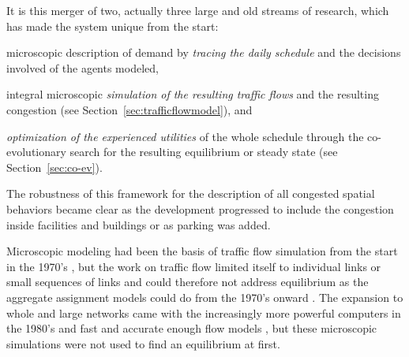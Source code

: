 It is this merger of two, actually three large and old streams of research, which has made the system unique from the start: 
\begin{compactitem}
\item microscopic description of demand by \emph{tracing the daily schedule} and the decisions involved of the agents modeled, 
%
\item integral microscopic \emph{simulation of the resulting traffic flows} and the resulting congestion (see Section~\ref{sec:trafficflowmodel}), and
%
\item  \emph{optimization of the experienced utilities} of the whole schedule through the co-evolutionary search for the resulting equilibrium or steady state (see Section~\ref{sec:co-ev}). 
%
\end{compactitem}
The robustness of this framework for the description of all congested spatial behaviors became clear as the development progressed to include the congestion inside facilities and buildings or as parking was added. 









Microscopic modeling had been the basis of traffic flow simulation from the start in the 1970’s \citep[e.g.,][]{Wiedemann_PhDThesis_1974, Seddon_Simulation_1972}, but the work on traffic flow limited itself to individual links or small sequences of links and could therefore not address equilibrium as the aggregate assignment models could do from the 1970’s onward \citep[see][]{OrtuzarWillumsen_2011}. The expansion to whole and large networks came with the increasingly more powerful computers in the 1980’s and fast and accurate enough flow models \citep[e.g.,][]{Schwerdtfeger_VolmulerHamerslag_1984,NagelSchreckenberg1992CA,Daganzo_TransResPartB_1994}, but these 
microscopic simulations were not used to find an \gls{equilibrium} at first. 

